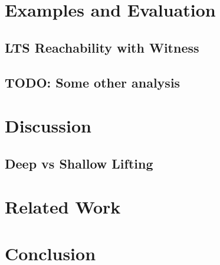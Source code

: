 \documentclass[11pt]{article} %
\begin{document}
\section{Examples and Evaluation}

\subsection{LTS Reachability with Witness}

\subsection{TODO: Some other analysis}

\section{Discussion}
\subsection{Deep vs Shallow Lifting}

\section{Related Work}

\section{Conclusion}

 

\end{document}

